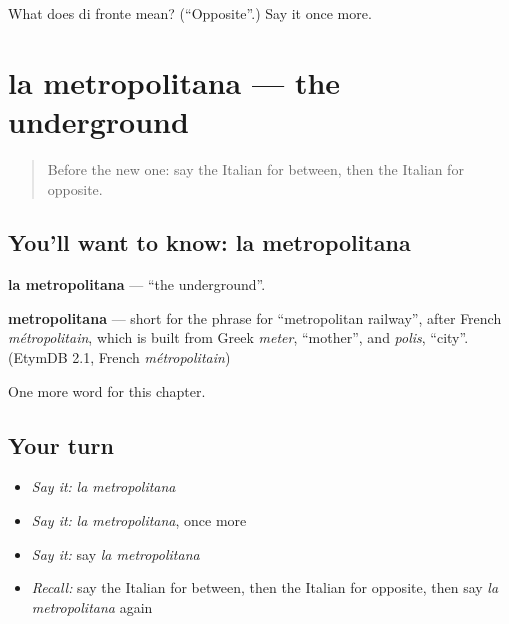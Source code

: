 \begin{tcolorbox}[breakable,colback=teal!4,colframe=teal!35!black,title={Before you move on}]
What does di fronte mean? (\textquotedblleft{}Opposite\textquotedblright{}.) Say it once more.
\end{tcolorbox}
\section[la metropolitana]{la metropolitana — the underground}

\label{lesson:IT-C92-metropolitana}



\begin{quote}
Before the new one: say the Italian for between, then the Italian for opposite.
\end{quote}

\subsection*{You'll want to know: la metropolitana}
\textbf{la metropolitana} — \textquotedblleft{}the underground\textquotedblright{}.

\begin{cousinweb}
\textbf{metropolitana} — short for the phrase for \textquotedblleft{}metropolitan railway\textquotedblright{}, after French \emph{métropolitain}, which is built from Greek \emph{meter}, \textquotedblleft{}mother\textquotedblright{}, and \emph{polis}, \textquotedblleft{}city\textquotedblright{}. (EtymDB 2.1, French \emph{métropolitain})
\end{cousinweb}

\begin{grammarlens}[title={What you've built}]
One more word for this chapter.
\end{grammarlens}

\subsection*{Your turn}
\begin{itemize}
\raggedright
  \item \emph{Say it:} \emph{la metropolitana}
  \item \emph{Say it:} \emph{la metropolitana}, once more
  \item \emph{Say it:} say \emph{la metropolitana}
  \item \emph{Recall:} say the Italian for between, then the Italian for opposite, then say \emph{la metropolitana} again
\end{itemize}

